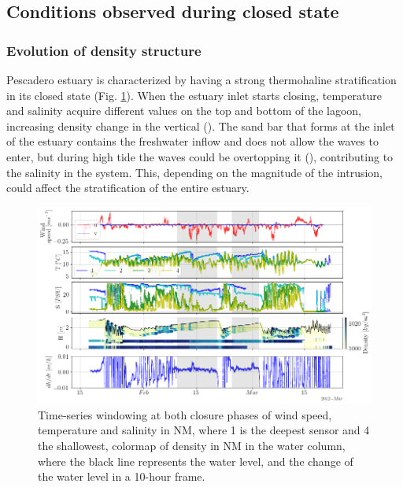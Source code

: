 \documentclass[11pt,letterpaper]{article}
\begin{document}


\subsection{Conditions observed during closed state}

\subsubsection{Evolution of density structure}

Pescadero estuary is characterized by having a strong thermohaline stratification in its closed state (Fig. \ref{fig:saltemp}). When the estuary inlet starts closing, temperature and salinity acquire different values on the top and bottom of the lagoon, increasing density change in the vertical (\cite{largier2015}). The sand bar that forms at the inlet of the estuary contains the freshwater inflow and does not allow the waves to enter, but during high tide the waves could be overtopping it (\cite{laudier2011measured}), contributing to the salinity in the system. This, depending on the magnitude of the intrusion, could affect the stratification of the entire estuary.\\
\begin{figure}[h!]
    \centering
    \includegraphics[scale=0.5]{Imagenes/saltemp.png}
    \caption{Time-series windowing at both closure phases of wind speed, temperature and salinity in NM, where 1 is the deepest sensor and 4 the shallowest, colormap of density in NM in the water column, where the black line represents the water level, and the change of the water level in a 10-hour frame.}
    \label{fig:saltemp}
\end{figure}
\end{document}
